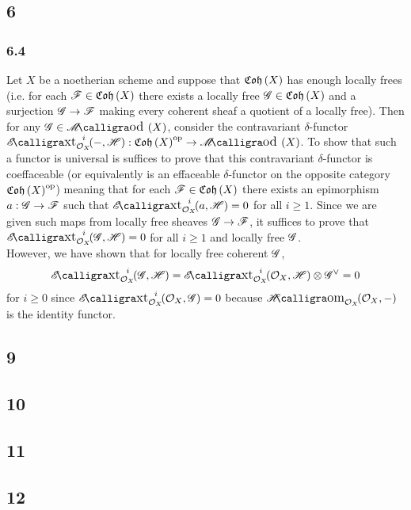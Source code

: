 \documentclass[12pt]{article}
\begin{document}
\subsection{6}

\subsubsection{6.4}

Let $X$ be a noetherian scheme and suppose that $\mathfrak{Coh}\left(X\right)$ has enough locally frees (i.e. for each $\mathscr{F} \in \mathfrak{Coh}\left(X\right)$ there exists a locally free $\mathscr{G} \in \mathfrak{Coh}\left(X\right)$ and a surjection $\mathscr{G} \to \mathscr{F}$ making every coherent sheaf a quotient of a locally free). Then for any $\G \in \shMod{X}$, consider the contravariant $\delta$-functor $\shExt{i}{\struct{X}}{-}{\H} : \Coh{X}^{\op} \to \shMod{X}$. To show that such a functor is universal is suffices to prove that this contravariant $\delta$-functor is coeffaceable (or equivalently is an effaceable $\delta$-functor on the opposite category $\mathfrak{Coh}\left(X\right)^{\mathrm{op}}$) meaning that for each $\mathscr{F} \in \mathfrak{Coh}\left(X\right)$ there exists an epimorphism $a : \mathscr{G} \to \mathscr{F}$ such that $\shExt{i}{\struct{X}}{a}{\H} = 0$ for all $i \ge 1$. Since we are given such maps from locally free sheaves $\mathscr{G} \to \mathscr{F}$, it suffices to prove that $\shExt{i}{\struct{X}}{\G}{\H} = 0$ for all $i \ge 1$ and locally free $\mathscr{G}$. 
\bigskip\\
However, we have shown that for locally free coherent $\mathscr{G}$,
\[ \shExt{i}{\struct{X}}{\G}{\H} = \shExt{i}{\struct{X}}{\struct{X}}{\H} \otimes \G^\vee = 0 \]
for $i \ge 0$ since $\shExt{i}{\struct{X}}{\struct{X}}{\G} = 0$ because $\shHomover{\struct{X}}{\struct{X}}{-}$ is the identity functor. 

\subsection{9}

\subsection{10}

\subsection{11}

\subsection{12}
\end{document}
